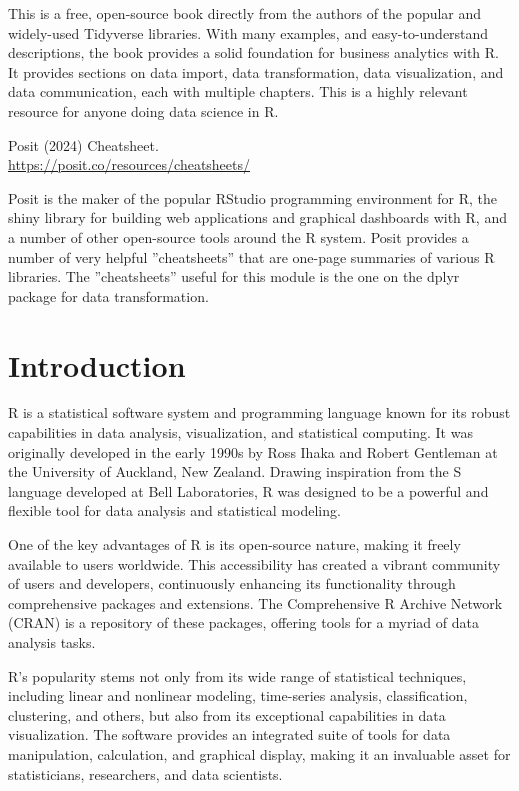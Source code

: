 This is a free, open-source book directly from the authors of the popular and widely-used Tidyverse libraries. With many examples, and easy-to-understand descriptions, the book provides a solid foundation for business analytics with R. It provides sections on data import, data transformation, data visualization, and data communication, each with multiple chapters. This is a highly relevant resource for anyone doing data science in R.

\begin{tcolorbox}[colback=alert]
Posit (2024) Cheatsheet. \\

\url{https://posit.co/resources/cheatsheets/}
\end{tcolorbox}

Posit is the maker of the popular RStudio programming environment for R, the shiny library for building web applications and graphical dashboards with R, and a number of other open-source tools around the R system. Posit provides a number of very helpful ''cheatsheets'' that are one-page summaries of various R libraries. The ''cheatsheets'' useful for this module is the one on the dplyr package for data transformation.


\section{Introduction}

R is a statistical software system and programming language known for its robust capabilities in data analysis, visualization, and statistical computing. It was originally developed in the early 1990s by Ross Ihaka and Robert Gentleman at the University of Auckland, New Zealand. Drawing inspiration from the S language developed at Bell Laboratories, R was designed to be a powerful and flexible tool for data analysis and statistical modeling.

One of the key advantages of R is its open-source nature, making it freely available to users worldwide. This accessibility has created a vibrant community of users and developers, continuously enhancing its functionality through comprehensive packages and extensions. The Comprehensive R Archive Network (CRAN) is a repository of these packages, offering tools for a myriad of data analysis tasks.

R's popularity stems not only from its wide range of statistical techniques, including linear and nonlinear modeling, time-series analysis, classification, clustering, and others, but also from its exceptional capabilities in data visualization. The software provides an integrated suite of tools for data manipulation, calculation, and graphical display, making it an invaluable asset for statisticians, researchers, and data scientists.

